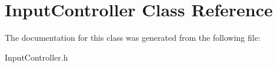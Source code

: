 \hypertarget{class_input_controller}{\section{Input\+Controller Class Reference}
\label{class_input_controller}
}


The documentation for this class was generated from the following file\+:\begin{DoxyCompactItemize}
\item 
Input\+Controller.\+h\end{DoxyCompactItemize}
